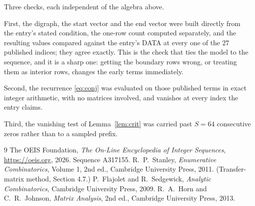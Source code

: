 \documentclass[11pt,a4paper]{article}
\theoremstyle{plain}
\theoremstyle{definition}
\begin{document}
Three checks, each independent of the algebra above.

First, the digraph, the start vector and the end vector were built directly from the
entry's stated condition, the one-row count computed separately, and the resulting values
compared against the entry's DATA at every one of the $27$ published indices; they
agree exactly. This is the check that ties the model to the sequence, and it is a sharp one:
getting the boundary rows wrong, or treating them as interior rows, changes the early terms
immediately.

Second, the recurrence \eqref{eq:conj} was evaluated on those published terms in exact
integer arithmetic, with no matrices involved, and vanishes at every index the entry claims.

Third, the vanishing test of Lemma~\ref{lem:crit} was carried past $S=64$ consecutive
zeros rather than to a sampled prefix.

\begin{thebibliography}{9}
 The OEIS Foundation, \emph{The On-Line Encyclopedia of Integer
Sequences}, \url{https://oeis.org}, 2026. Sequence A317155.
 R.~P.~Stanley, \emph{Enumerative Combinatorics}, Volume 1, 2nd ed.,
Cambridge University Press, 2011. (Transfer-matrix method, Section 4.7.)
 P.~Flajolet and R.~Sedgewick, \emph{Analytic Combinatorics}, Cambridge
University Press, 2009.
 R.~A.~Horn and C.~R.~Johnson, \emph{Matrix Analysis}, 2nd ed., Cambridge
University Press, 2013.
\end{thebibliography}
\end{document}
